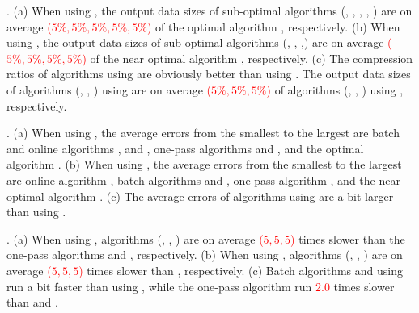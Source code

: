 \emph{}. 
(a) When using \ped, the output data sizes of sub-optimal algorithms (\tpa, \dpa, \bqsa, \siped, \operb) are on average \textcolor{red}{($5\%,5\%,5\%, 5\%,5\%$)} of the optimal algorithm \optp, respectively.
(b) When using \sed, the output data sizes of sub-optimal algorithms (\tpa, \dpa, \squishe,\cised) are on average \textcolor{red}{($5\%,5\%,5\%,5\%$)} of the near optimal algorithm \nopts, respectively.
(c) The compression ratios of algorithms using \ped are obviously better than using \sed. The output data sizes of algorithms (\optp, \tpa, \dpa) using \ped are on average \textcolor{red}{($5\%,5\%,5\%$)} of algorithms (\nopts, \tpa, \dpa) using \sed, respectively.

\emph{}. 
(a) When using \ped, the average errors from the smallest to the largest are batch and online algorithms \tpa, \dpa and \bqsa, one-pass algorithms \siped and \operb, and the optimal algorithm \optp. 
(b) When using \sed, the average errors from the smallest to the largest are online algorithm \squishe, batch algorithms \tpa and \dpa, one-pass algorithm \cised, and the near optimal algorithm \nopts.
(c) The average errors of algorithms using \sed are a bit larger than using \ped. 

\emph{}.
(a) When using \ped, algorithms (\tpa, \dpa, \bqsa) are on average \textcolor{red}{($5,5,5$)} times slower than the one-pass algorithms \siped and \operb, respectively. 
(b) When using \sed, algorithms (\tpa, \dpa, \squishe) are on average \textcolor{red}{($5,5,5$)} times slower than \cised, respectively.
(c) Batch algorithms \dpa and \tpa using \sed run a bit faster than using \ped, while the one-pass algorithm \cised run \textcolor{red}{$2.0$} times slower than \siped and \operb.




